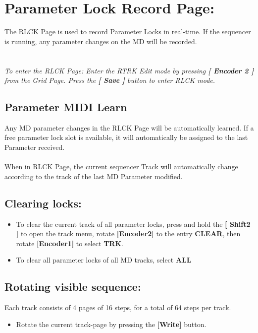 \chapter{Parameter Lock Record  Page:}
The RLCK Page is used to record Parameter Locks in real-time. If the sequencer is running, any parameter changes on the MD will be recorded.\\
\\
\\
\textit{To enter the RLCK Page: Enter the RTRK Edit mode by pressing \textbf{[ Encoder 2 ]} from the Grid Page. Press the \textbf{[ Save ]} button to enter RLCK mode.}
\section{Parameter MIDI Learn}
Any MD parameter changes in the RLCK Page will be automatically learned. If a free parameter lock slot is available, it will automatically be assigned to the last Parameter received. \\
\\
When in RLCK Page, the current sequencer Track will automatically change according to the track of the last MD Parameter modified. 


\section{Clearing locks:}
\begin{itemize}
\item To clear the current track of all parameter locks, press and hold the\textbf{ [ Shift2 ]} to open the track menu, rotate \textbf{[Encoder2]} to the entry \textbf{CLEAR}, then rotate \textbf{[Encoder1]} to select \textbf{TRK}.
\item To clear all parameter locks of all MD tracks, select \textbf{ALL}
\end{itemize}

\vspace{-0.3cm}

\section{Rotating visible sequence:}
Each track consists of 4 pages of 16 steps, for a total of 64 steps per track.
\begin{itemize}
\item Rotate the current track-page by pressing the \textbf{[Write] }button.
\end{itemize}

